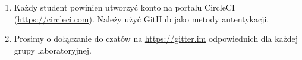 \documentclass[12pt]{article}
\begin{document}
\begin{enumerate}

        \item Każdy student powinien utworzyć konto na portalu CircleCI (\url{https://circleci.com}). Należy użyć GitHub jako metody autentykacji.

        \item Prosimy o dołączanie do czatów na \url{https://gitter.im} odpowiednich dla każdej grupy laboratoryjnej.
    \end{enumerate}
\end{document}
